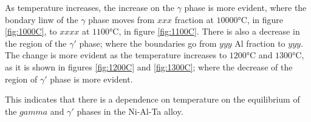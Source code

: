 As temperature increases, the increase on the $\gamma$ phase is more evident, where the bondary linw of the $\gamma$ phase moves from $xxx$ fraction at $10000$°C, in figure \ref{fig:1000C}, to $xxxx$ at $1100$°C, in figure \ref{fig:1100C}. There is also a decrease in the region of the $\gamma'$ phase; where the boundaries go from $yyy$ Al fraction to $yyy$. The change is more evident as the temperature increases to $1200$°C and $1300$°C, as it is shown in figures \ref{fig:1200C} and \ref{fig:1300C}; where the decrease of the region of $\gamma'$ phase is more evident. 

This indicates that there is a dependence on temperature on the equilibrium of the $gamma$ and $\gamma'$ phases in the Ni-Al-Ta alloy.

\begin{figure}[H]
  \centering
  \ContinuedFloat
   \\
\end{figure}
